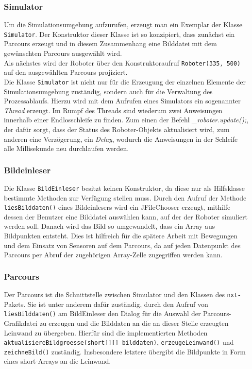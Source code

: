 \documentclass[paper=a4, DIV=14, BCOR=15mm, twoside=on, onecolumn=on, open = right, titlepage =on, parskip =half, headsepline = on, footsepline = on, chapterprefix = on, appendixprefix = off, fontsize = 12pt, numbers = noenddot, abstract = on]{scrbook}
\begin{document}
\subsubsection{Simulator}

Um die Simulationsumgebung aufzurufen, erzeugt man ein Exemplar der Klasse \texttt{Si\-mu\-la\-tor}. Der Konstruktor dieser Klasse ist so konzipiert, dass zunächst ein Parcours erzeugt und in diesem Zusammenhang eine Bilddatei mit dem gewünschten Parcours ausgewählt wird.\\
Als nächstes wird der Roboter über den Konstruktoraufruf \texttt{Roboter(335, 500)} auf den ausgewählten Parcours projiziert.\\
Die Klasse \texttt{Simulator} ist nicht nur für die Erzeugung der einzelnen Elemente der Simulationsumgebung zuständig, sondern auch für die Verwaltung des Prozessablaufs. Hierzu wird mit dem Aufrufen eines Simulators ein sogenannter \emph{Thread} erzeugt. Im Rumpf des Threads sind wiederum zwei Anweisungen innerhalb einer Endlosschleife zu finden. Zum einen der Befehl \emph{{\_}roboter.update();}, der dafür sorgt, dass der Status des Roboter-Objekts aktualisiert wird, zum anderen eine Verzögerung, ein \emph{Delay}, wodurch die Anweisungen in der Schleife alle Millisekunde neu durchlaufen werden. 


\subsubsection{Bildeinleser}
Die Klasse \texttt{BildEinleser} besitzt keinen Konstruktor, da diese nur als Hilfsklasse bestimmte Methoden zur Verfügung stellen muss. Durch den Aufruf der Methode\\
\texttt{liesBilddaten()} eines Bildeinlesers wird ein JFileChooser erzeugt, mithilfe dessen der Benutzer eine Bilddatei auswählen kann, auf der der Roboter simuliert werden soll. Danach wird das Bild so umgewandelt, dass ein Array aus Bildpunkten entsteht. Dies ist hilfreich für die spätere Arbeit mit Bewegungen und dem Einsatz von Sensoren auf dem Parcours, da auf jeden Datenpunkt des Parcours per Abruf der zugehörigen Array-Zelle zugegriffen werden kann.

\subsubsection{Parcours}
Der Parcours ist die Schnittstelle zwischen Simulator und den Klassen des \texttt{nxt-}Pakets. Sie ist unter anderem dafür zuständig, durch den Aufruf von \texttt{liesBilddaten()} am BildEinleser den Dialog für die Auswahl der Parcours-Grafikdatei zu erzeugen und die Bilddaten an die an dieser Stelle erzeugten Leinwand zu übergeben. Hierfür sind die implementierten Methoden \texttt{aktualisiere\-Bildgroes\-se(short[][] bild\-daten)}, \texttt{er\-zeu\-ge\-Lein\-wand()} und \texttt{zeichneBild()} zuständig. Insbesondere letztere übergibt die Bildpunkte in Form eines short-Arrays an die Leinwand.
\end{document}
